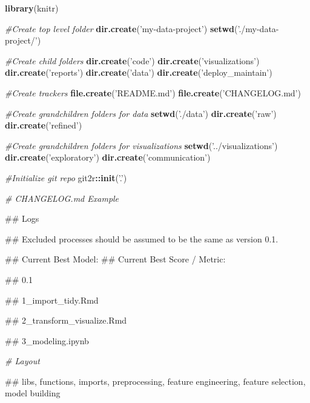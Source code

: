 \documentclass[]{book}
\newenvironment{Shaded}{\begin{snugshade}}{\end{snugshade}}
\newcommand{\KeywordTok}[1]{\textcolor[rgb]{0.13,0.29,0.53}{\textbf{#1}}}
\newcommand{\StringTok}[1]{\textcolor[rgb]{0.31,0.60,0.02}{#1}}
\newcommand{\CommentTok}[1]{\textcolor[rgb]{0.56,0.35,0.01}{\textit{#1}}}
\newcommand{\OperatorTok}[1]{\textcolor[rgb]{0.81,0.36,0.00}{\textbf{#1}}}
\newcommand{\NormalTok}[1]{#1}
\theoremstyle{definition}
\theoremstyle{definition}
\theoremstyle{definition}
\theoremstyle{remark}
\begin{document}
\begin{Shaded}
\begin{Highlighting}[]
\KeywordTok{library}\NormalTok{(knitr)}

\CommentTok{#Create top level folder}
\KeywordTok{dir.create}\NormalTok{(}\StringTok{'my-data-project'}\NormalTok{)}
\KeywordTok{setwd}\NormalTok{(}\StringTok{'./my-data-project/'}\NormalTok{)}

\CommentTok{#Create child folders}
\KeywordTok{dir.create}\NormalTok{(}\StringTok{'code'}\NormalTok{)}
\KeywordTok{dir.create}\NormalTok{(}\StringTok{'visualizations'}\NormalTok{)}
\KeywordTok{dir.create}\NormalTok{(}\StringTok{'reports'}\NormalTok{)}
\KeywordTok{dir.create}\NormalTok{(}\StringTok{'data'}\NormalTok{)}
\KeywordTok{dir.create}\NormalTok{(}\StringTok{'deploy_maintain'}\NormalTok{)}

\CommentTok{#Create trackers}
\KeywordTok{file.create}\NormalTok{(}\StringTok{'README.md'}\NormalTok{)}
\KeywordTok{file.create}\NormalTok{(}\StringTok{'CHANGELOG.md'}\NormalTok{)}

\CommentTok{#Create grandchildren folders for data}
\KeywordTok{setwd}\NormalTok{(}\StringTok{'./data'}\NormalTok{)}
\KeywordTok{dir.create}\NormalTok{(}\StringTok{'raw'}\NormalTok{)}
\KeywordTok{dir.create}\NormalTok{(}\StringTok{'refined'}\NormalTok{)}

\CommentTok{#Create grandchildren folders for visualizations}
\KeywordTok{setwd}\NormalTok{(}\StringTok{'../visualizations'}\NormalTok{)}
\KeywordTok{dir.create}\NormalTok{(}\StringTok{'exploratory'}\NormalTok{)}
\KeywordTok{dir.create}\NormalTok{(}\StringTok{'communication'}\NormalTok{)}

\CommentTok{#Initialize git repo}
\NormalTok{git2r}\OperatorTok{::}\KeywordTok{init}\NormalTok{(}\StringTok{'.'}\NormalTok{)}

\CommentTok{# CHANGELOG.md Example}

\NormalTok{## Logs}

\NormalTok{## Excluded processes should be assumed to be the same as version 0.1.}

\NormalTok{## Current Best Model:}
\NormalTok{## Current Best Score / Metric:}

\NormalTok{## 0.1}

\NormalTok{## 1_import_tidy.Rmd}

\NormalTok{## 2_transform_visualize.Rmd}

\NormalTok{## 3_modeling.ipynb}

\CommentTok{# Layout}

\NormalTok{## libs, functions, imports, preprocessing, feature engineering, feature selection, model building}
\end{Highlighting}
\end{Shaded}
\end{document}
